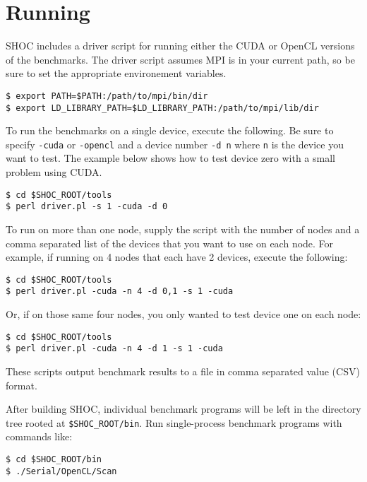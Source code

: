 \documentclass[11pt]{article}
\begin{document}
\section{Running}\label{sec:running}

SHOC includes a driver script for running either the CUDA or OpenCL versions
of the benchmarks. The driver script assumes MPI is in your current path,
so be sure to set the appropriate environement variables.

\begin{Verbatim}[frame=single]
$ export PATH=$PATH:/path/to/mpi/bin/dir
$ export LD_LIBRARY_PATH=$LD_LIBRARY_PATH:/path/to/mpi/lib/dir
\end{Verbatim}

To run the benchmarks on a single device, execute the following. Be sure
to specify \verb+-cuda+ or \verb+-opencl+ and a device number \verb+-d n+
where \verb+n+ is the device you want to test. The example below shows how
to test device zero with a small problem using CUDA.

\begin{Verbatim}[frame=single]
$ cd $SHOC_ROOT/tools
$ perl driver.pl -s 1 -cuda -d 0
\end{Verbatim}

To run on more than one node, supply the script with the number of nodes and 
a comma separated list of the devices that you want to use on each node. For
example, if running on 4 nodes that each have 2 devices, execute the following: 

\begin{Verbatim}[frame=single]
$ cd $SHOC_ROOT/tools
$ perl driver.pl -cuda -n 4 -d 0,1 -s 1 -cuda
\end{Verbatim}

Or, if on those same four nodes, you only wanted to test device one on each node:

\begin{Verbatim}[frame=single]
$ cd $SHOC_ROOT/tools
$ perl driver.pl -cuda -n 4 -d 1 -s 1 -cuda
\end{Verbatim}

These scripts output benchmark results to a file in comma separated value (CSV) format.

After building SHOC, individual benchmark programs will be left in the
directory tree rooted at \verb+$SHOC_ROOT/bin+.
Run single-process benchmark programs with commands like:

\begin{Verbatim}[frame=single]
$ cd $SHOC_ROOT/bin
$ ./Serial/OpenCL/Scan 
\end{Verbatim}
\end{document}
